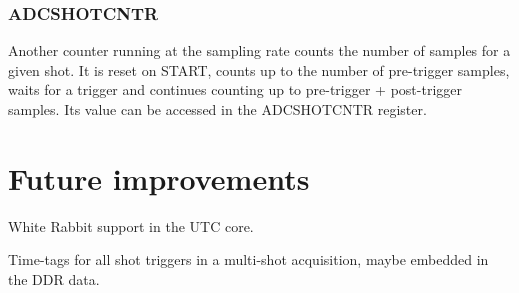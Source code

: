 \documentclass[a4paper]{article}
\newenvironment{packed_item}{
\begin{itemize}
  \setlength{\itemsep}{1pt}
  \setlength{\parskip}{0pt}
  \setlength{\parsep}{0pt}
}{\end{itemize}}
\begin{document}
\subsubsection{ADCSHOTCNTR}
Another counter running at the sampling rate counts the number of samples for a given shot. It is reset on START, counts up to the number of pre-trigger samples, waits for a trigger and continues counting up to pre-trigger + post-trigger samples. Its value can be accessed in the ADCSHOTCNTR register.

\newpage

\section{Future improvements}
\begin{packed_item}
\item White Rabbit support in the UTC core.
\item Time-tags for all shot triggers in a multi-shot acquisition, maybe embedded in the DDR data.
\end{packed_item}
\end{document}
